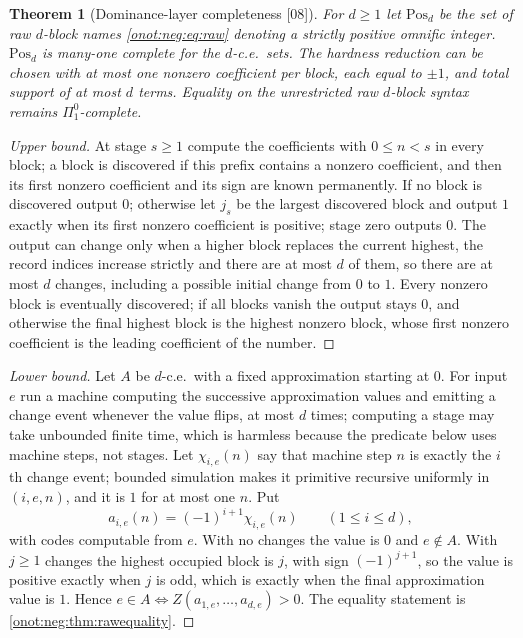 \documentclass[11pt,oneside]{article}
\numberwithin{equation}{section}
\newtheorem{theorem}{Theorem}[section]
\theoremstyle{definition}
\theoremstyle{remark}
\newcommand{\Pos}{\mathrm{Pos}}
\newcommand{\src}[1]{\textup{\textsf{\small[#1]}}}
\begin{document}
\begin{theorem}[Dominance-layer completeness \src{08}]\label{onot:neg:thm:ershov}
For $d\ge1$ let $\Pos_d$ be the set of raw $d$-block names \eqref{onot:neg:eq:raw}
denoting a strictly positive omnific integer. $\Pos_d$ is many-one complete for
the $d$-c.e.\ sets. The hardness reduction can be chosen with at most one nonzero
coefficient per block, each equal to $\pm1$, and total support of at most $d$
terms. Equality on the unrestricted raw $d$-block syntax remains
$\Pi^0_1$-complete.
\end{theorem}
\begin{proof}[Upper bound]
At stage $s\ge1$ compute the coefficients with $0\le n<s$ in every block; a block
is discovered if this prefix contains a nonzero coefficient, and then its first
nonzero coefficient and its sign are known permanently. If no block is discovered
output $0$; otherwise let $j_s$ be the largest discovered block and output $1$
exactly when its first nonzero coefficient is positive; stage zero outputs $0$. The
output can change only when a higher block replaces the current highest, the
record indices increase strictly and there are at most $d$ of them, so there are at
most $d$ changes, including a possible initial change from $0$ to $1$. Every
nonzero block is eventually discovered; if all blocks vanish the output stays $0$,
and otherwise the final highest block is the highest nonzero block, whose first
nonzero coefficient is the leading coefficient of the number.
\end{proof}
\begin{proof}[Lower bound]
Let $A$ be $d$-c.e.\ with a fixed approximation starting at $0$. For input $e$ run
a machine computing the successive approximation values and emitting a change event
whenever the value flips, at most $d$ times; computing a stage may take unbounded
finite time, which is harmless because the predicate below uses machine steps, not
stages. Let $\chi_{i,e}(n)$ say that machine step $n$ is exactly the $i$th change
event; bounded simulation makes it primitive recursive uniformly in $(i,e,n)$, and
it is $1$ for at most one $n$. Put
\begin{equation}\label{onot:neg:eq:mindchangecode}
 a_{i,e}(n)=(-1)^{i+1}\chi_{i,e}(n)\qquad(1\le i\le d),
\end{equation}
with codes computable from $e$. With no changes the value is $0$ and $e\notin A$.
With $j\ge1$ changes the highest occupied block is $j$, with sign $(-1)^{j+1}$, so
the value is positive exactly when $j$ is odd, which is exactly when the final
approximation value is $1$. Hence $e\in A\iff Z(a_{1,e},\ldots,a_{d,e})>0$. The
equality statement is \cref{onot:neg:thm:rawequality}.
\end{proof}
\end{document}
